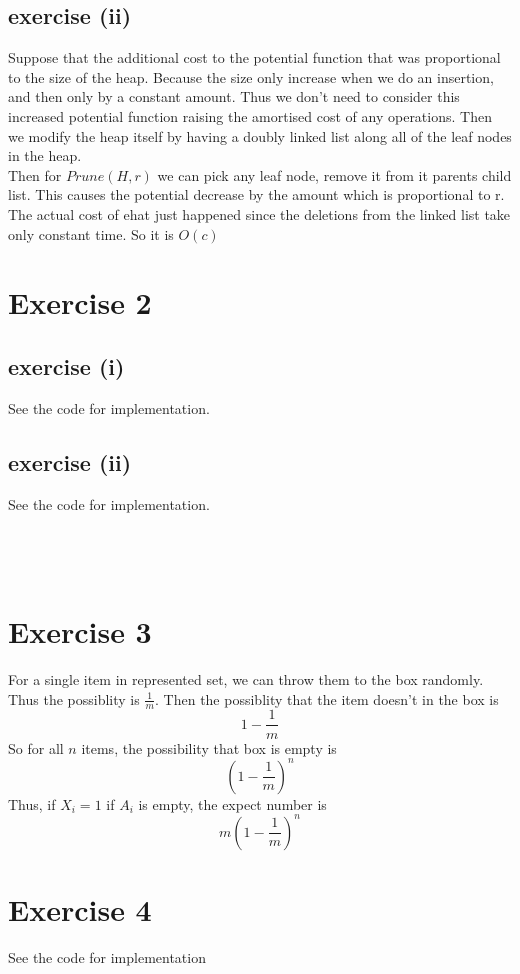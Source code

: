 \documentclass[12pt,oneside,a4paper]{article}
\begin{document}
\subsection{exercise (ii)}
Suppose that the additional cost to the potential function that was proportional to the size of the heap. Because the size only increase
when we do an insertion, and then only by a constant amount. Thus we don't need to consider this increased potential function raising
the amortised cost of any operations. Then we modify the heap itself  by having a doubly linked list along all of the leaf nodes in the heap.\\
Then for $Prune(H,r)$ we can pick any leaf node, remove it from it parents child list. This causes the potential decrease by the amount which 
is proportional to r. The actual cost of ehat just happened since the deletions from the linked list take only constant time.
So it is $O(c)$
\section{Exercise 2}
\subsection{exercise (i)}
See the code for implementation.
\subsection{exercise (ii)}
See the code for implementation.\\
~\\
~\\
~\\ 
\section{Exercise 3}

For a single item in represented set, we can throw them to the box randomly. Thus the possiblity is $\frac{1}{m}$. Then the possiblity that 
the item doesn't in the box is 
$$
1-\frac{1}{m}
$$
So for all $n$ items, the possibility that box is empty is 
$$
(1-\frac{1}{m})^n
$$
Thus, if $X_i=1$ if $A_i$ is empty, the expect number is 
$$
m(1-\frac{1}{m})^n
$$ 
\section{Exercise 4}
See the code for implementation
\end{document}
